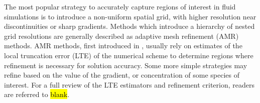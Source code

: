 \documentclass[]{article}
\begin{document}
    The most popular strategy to accurately capture regions of interest in fluid
    simulations is to introduce a non-uniform spatial grid, with higher
    resolution near discontinuities or sharp gradients.  Methods which introduce
    a hierarchy of nested grid resolutions are generally described as adaptive
    mesh refinement (AMR) methods. AMR methods, first introduced in
    \cite{berger1984}, usually rely on estimates of the local truncation error
    (LTE) of the numerical scheme to determine regions where refinement is
    necessary for solution accuracy. Some more simple strategies may refine
    based on the value of the gradient, or concentration of some species of
    interest. For a full review of the LTE estimators and refinement criterion,
    readers are referred to \hl{blank}.
\end{document}
